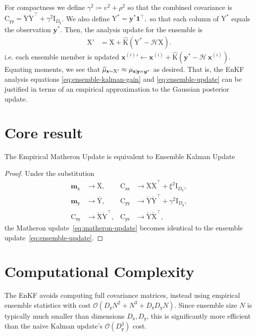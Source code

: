 \documentclass[wcp]{jmlr} %
\newcommand{\vv}[1]{\boldsymbol{#1}}
\newcommand{\mm}[1]{\mathrm{#1}}
\newcommand{\mmmean}[1]{\bar{\mathrm{#1}}}
\newcommand{\mmdev}[1]{\breve{\mathrm{#1}}}
\newcommand{\rv}[1]{\mathsf{#1}}
\newcommand{\vrv}[1]{\vv{\rv{#1}}}
\newcommand{\op}[1]{\mathcal{#1}}
\newcommand{\gvn}{\mid}
\begin{document}
For compactness we define \(\gamma^2 \coloneq \upsilon^2 + \rho^2\) so that the combined covariance is \(\mm{C}_{\vrv{yy}} = \mmdev{Y} \mmdev{Y}^\top + \gamma^2\mm{I}_{D_{\vrv{y}}}\).
We also define
$\mm{Y}^* = \vv{y}^* \mathbf{1}^\top,$
so that each column of \(\mm{Y}^*\) equals the observation \(\vv{y}^*\). Then, the analysis update for the ensemble is
\begin{align}
    \mm{X}' &= \mm{X} + \widehat{\mm{K}} \left(\mm{Y}^* - \op{H}\mm{X}\right).\label{eq:ensemble-update}
\end{align}
i.e. each ensemble member is updated
\(\vv{x}^{(i)}{}' \gets \vv{x}^{(i)} + \widehat{\mm{K}} \left(\vv{y}^* - \op{H}\,\vv{x}^{(i)}\right).\)
Equating moments, we see that
\(\ELaw[\vrv{x}\sim \mm{X}']
\approx \Law[\vrv{x} \gvn \vrv{y}=\vv{y}^*] \) as desired.
That is, the EnKF analysis equations \eqref{eq:ensemble-kalman-gain} and \eqref{eq:ensemble-update} can be justified in terms of an empirical approximation to the Gaussian posterior update.

\section{Core result}
\begin{proposition}
    The Empirical Matheron Update is equivalent to Ensemble Kalman Update
\end{proposition}
\begin{proof}
Under the substitution
\begin{align}
    \vv{m}_{\vrv{x}} &\to \mmmean{X}, & \mm{C}_{\vrv{xx}} &\to \mmdev{X} \mmdev{X}^\top + \xi^2\mm{I}_{D_{\vrv{x}}},\\
    \vv{m}_{\vrv{y}} &\to \mmmean{Y}, & \mm{C}_{\vrv{yy}} &\to \mmdev{Y} \mmdev{Y}^\top + \gamma^2\mm{I}_{D_{\vrv{y}}},\\
    \mm{C}_{\vrv{xy}} &\to \mmdev{X} \mmdev{Y}^\top, & \mm{C}_{\vrv{yx}} &\to \mmdev{Y} \mmdev{X}^\top,
\end{align}
the Matheron update~\eqref{eq:matheron-update} becomes identical to the ensemble update~\eqref{eq:ensemble-update}.
\end{proof}

\section{Computational Complexity}
The EnKF avoids computing full covariance matrices, instead using empirical ensemble statistics with cost $\mathcal{O}(D_{\vrv{y}}N^2 + N^3 + D_{\vrv{x}}D_{\vrv{y}}N)$. Since ensemble size $N$ is typically much smaller than dimensions $D_{\vrv{x}}, D_{\vrv{y}}$, this is significantly more efficient than the naive Kalman update's $\mathcal{O}(D_{\vrv{y}}^3)$ cost.
\end{document}
